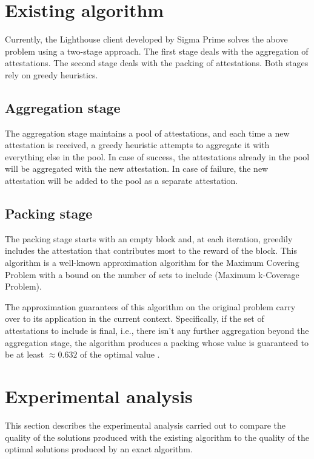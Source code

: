 \documentclass{article}
\begin{document}
\section{Existing algorithm}

Currently, the Lighthouse client developed by Sigma Prime solves the above
problem using a two-stage approach. The first stage deals with the aggregation
of attestations. The second stage deals with the packing of attestations.
Both stages rely on greedy heuristics.

\subsection{Aggregation stage}

The aggregation stage maintains a pool of attestations, and each time a new
attestation is received, a greedy heuristic attempts to aggregate it with
everything else in the pool. In case of success, the attestations already in
the pool will be aggregated with the new attestation. In case of failure, the
new attestation will be added to the pool as a separate attestation. 

\subsection{Packing stage}

The packing stage starts with an empty block and, at each iteration, greedily
includes the attestation that contributes most to the reward of the block.
This algorithm is a well-known approximation algorithm for the Maximum Covering
Problem with a bound on the number of sets to include (Maximum k-Coverage
Problem). 

The approximation guarantees of this algorithm on the original problem carry
over to its application in the current context. Specifically, if the set of
attestations to include is final, i.e., there isn't any further aggregation
beyond the aggregation stage, the algorithm produces a packing whose value is
guaranteed to be at least $\approx 0.632$ of the optimal value
\cite{Hochbaum98}.

\section{Experimental analysis}

This section describes the experimental analysis carried out to compare the
quality of the solutions produced with the existing algorithm to the quality 
of the optimal solutions produced by an exact algorithm.
\end{document}
